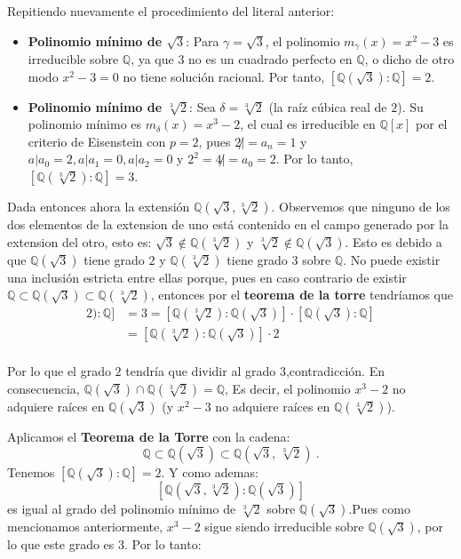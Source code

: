\begin{solucion}
    Repitiendo nuevamente el procedimiento del literal anterior:
\begin{itemize}
    \item \textbf{Polinomio mínimo de $\sqrt{3}$}: Para $\gamma = \sqrt{3}$, el polinomio $m_\gamma(x) = x^2 - 3$ es irreducible sobre $\mathbb{Q}$, ya que $3$ no es un cuadrado perfecto en $\mathbb{Q}$, o dicho de otro modo $x^2 - 3 = 0$ no tiene solución racional. Por tanto, $[\mathbb{Q}(\sqrt{3}) : \mathbb{Q}] = 2$.

    \item \textbf{Polinomio mínimo de $\sqrt[3]{2}$}: Sea $\delta = \sqrt[3]{2}$ (la raíz cúbica real de $2$). Su polinomio mínimo es $m_\delta(x) = x^3 - 2$, el cual es irreducible en $\mathbb{Q}[x]$ por el criterio de Eisenstein con $p=2$, pues $2\not|=a_n=1$ y $a|a_0=2, a|a_1=0, a|a_2=0$ y $2^2=4\not|=a_0=2$. Por lo tanto, $[\mathbb{Q}(\sqrt[3]{2}) : \mathbb{Q}] = 3$.
\end{itemize}

Dada entonces ahora la extensión $\mathbb{Q}(\sqrt{3}, \sqrt[3]{2})$. Observemos que ninguno de los dos elementos de la extension de uno está contenido en el campo generado por la extension del otro, esto es: $\sqrt{3} \notin \mathbb{Q}(\sqrt[3]{2})$ y $\sqrt[3]{2} \notin \mathbb{Q}(\sqrt{3})$. Esto es debido a que $\mathbb{Q}(\sqrt{3})$ tiene grado $2$ y $\mathbb{Q}(\sqrt[3]{2})$ tiene grado $3$ sobre $\mathbb{Q}$. No puede existir una inclusión estricta entre ellas porque, pues en caso contrario de existir $\mathbb Q \subset \mathbb{Q}(\sqrt{3}) \subset \mathbb{Q}(\sqrt[3]{2})$, entonces por el \textbf{teorema de la torre} tendríamos que 
\begin{align*}
    [\mathbb{Q}(\sqrt[3]{2}) : \mathbb{Q}] &=3= [\mathbb{Q}(\sqrt[3]{2}) : \mathbb{Q}(\sqrt{3})] \cdot [\mathbb{Q}(\sqrt{3}) : \mathbb{Q}]\\
    &= [\mathbb{Q}(\sqrt[3]{2}) : \mathbb{Q}(\sqrt{3})] \cdot 2\\
\end{align*}

Por lo que el grado $2$ tendría que dividir al grado $3$,contradicción. En consecuencia,  
 $\mathbb{Q}(\sqrt{3})\cap \mathbb{Q}(\sqrt[3]{2}) = \mathbb{Q}$, Es decir, el polinomio $x^3 - 2$ no adquiere raíces en $\mathbb{Q}(\sqrt{3})$ (y $x^2 - 3$ no adquiere raíces en $\mathbb{Q}(\sqrt[3]{2})$).

Aplicamos el \textbf{Teorema de la Torre} con la cadena:
\[
\mathbb{Q} \subset \mathbb{Q}(\sqrt{3}) \subset \mathbb{Q}(\sqrt{3},\, \sqrt[3]{2})~.
\]
Tenemos $[\mathbb{Q}(\sqrt{3}) : \mathbb{Q}] = 2$. Y como ademas:
\[
[\mathbb{Q}(\sqrt{3}, \sqrt[3]{2}) : \mathbb{Q}(\sqrt{3})]
\]
es igual al grado del polinomio mínimo de $\sqrt[3]{2}$ sobre $\mathbb{Q}(\sqrt{3})$.Pues 
 como mencionamos anteriormente, $x^3 - 2$ sigue siendo irreducible sobre $\mathbb{Q}(\sqrt{3})$, por lo que este grado es $3$. Por lo tanto:


\end{solucion}
